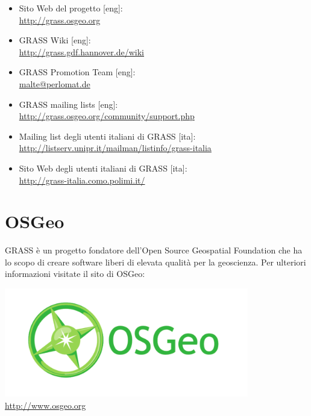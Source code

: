 \documentclass[notumble,a4paper,10pt,nofoldmark]{leaflet}
\newcommand{\GRASSurl}{\url{http://grass.osgeo.org}}
\begin{document}
\begin{itemize}
\item{Sito Web del progetto [eng]: \\\GRASSurl}
\item{GRASS Wiki  [eng]: \\\url{http://grass.gdf.hannover.de/wiki}}
\item{GRASS Promotion Team  [eng]: \\\url{malte@perlomat.de}}
\item{GRASS mailing lists  [eng]: \\\url{http://grass.osgeo.org/community/support.php}}
\item{Mailing list degli utenti italiani di GRASS  [ita]: \\\url{http://listserv.unipr.it/mailman/listinfo/grass-italia}}
\item{Sito Web degli utenti italiani di GRASS [ita]: \\\url{http://grass-italia.como.polimi.it/}}
\end{itemize}

\vfill
\section{OSGeo}

GRASS \`e un progetto fondatore dell'Open Source Geospatial Foundation che ha lo scopo di creare software liberi di elevata qualit\`a per la geoscienza. Per ulteriori informazioni visitate il sito di OSGeo:
\begin{center}
\includegraphics[width=0.8\textwidth]{OSGeo_CMYK}\\
\url{http://www.osgeo.org}
\end{center}
\end{document}
